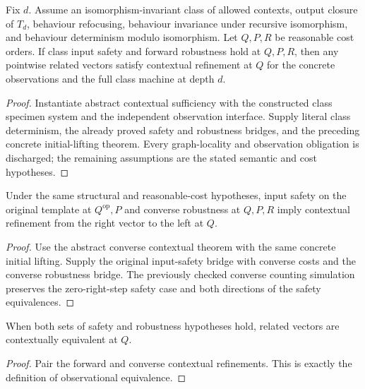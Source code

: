 \begin{theorem}
Fix $d$. Assume an isomorphism-invariant class of allowed contexts, output closure of $T_d$, behaviour refocusing, behaviour invariance under recursive isomorphism, and behaviour determinism modulo isomorphism. Let $Q,P,R$ be reasonable cost orders. If class input safety and forward robustness hold at $Q,P,R$, then any pointwise related vectors satisfy contextual refinement at $Q$ for the concrete observations and the full class machine at depth $d$.
\end{theorem}
\begin{proof}
Instantiate abstract contextual sufficiency with the constructed class specimen system and the independent observation interface. Supply literal class determinism, the already proved safety and robustness bridges, and the preceding concrete initial-lifting theorem. Every graph-locality and observation obligation is discharged; the remaining assumptions are the stated semantic and cost hypotheses.
\end{proof}

\begin{theorem}
Under the same structural and reasonable-cost hypotheses, input safety on the original template at $Q^{\mathrm{op}},P$ and converse robustness at $Q,P,R$ imply contextual refinement from the right vector to the left at $Q$.
\end{theorem}
\begin{proof}
Use the abstract converse contextual theorem with the same concrete initial lifting. Supply the original input-safety bridge with converse costs and the converse robustness bridge. The previously checked converse counting simulation preserves the zero-right-step safety case and both directions of the safety equivalences.
\end{proof}

\begin{corollary}
When both sets of safety and robustness hypotheses hold, related vectors are contextually equivalent at $Q$.
\end{corollary}
\begin{proof}
Pair the forward and converse contextual refinements. This is exactly the definition of observational equivalence.
\end{proof}

